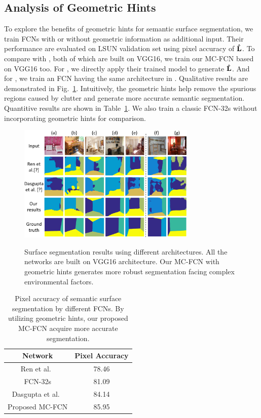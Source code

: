 \subsection{Analysis of Geometric Hints}
\label{sec:ablation}
To explore the benefits of geometric hints for semantic surface segmentation, we train FCNs with or without geometric information as additional input. Their performance are evaluated on LSUN validation set using pixel accuracy of $\mathbf{\hat{L}}$. To compare with \cite{ren2016coarse, dasgupta2016delay}, both of which are built on VGG16, we train our MC-FCN based on VGG16 too. For \cite{ren2016coarse}, we directly apply their trained model to generate $\mathbf{\hat{L}}$. And for \cite{dasgupta2016delay}, we train an FCN having the same architecture in \cite{dasgupta2016delay}. Qualitative results are demonstrated in Fig.~\ref{fig:fcn-comparison}. Intuitively, the geometric hints help remove the spurious regions caused by clutter and generate more accurate semantic segmentation. Quantitive results are shown in Table~\ref{table:ablation}. We also train a classic FCN-32s without incorporating geometric hints for comparison.

\begin{figure}[!ht]
	\centering 
	\textsc{\includegraphics[width=8.5cm]{figure/compare.png}}
	\caption{Surface segmentation results using different architectures. All the networks are built on VGG16 architecture. Our MC-FCN with geometric hints generates more robust segmentation facing complex environmental factors.}
	\label{fig:fcn-comparison}
\end{figure}

\begin{table}
	\centering
	\begin{tabular}{c|c}
		\hline
		Network & Pixel Accuracy\\
		\hline
		Ren et al.~\cite{ren2016coarse} & 78.46 \\
		FCN-32s & 81.09 \\ 
		Dasgupta et al.~\cite{dasgupta2016delay} & 84.14 \\ 
		Proposed MC-FCN  & 85.95 \\
		\hline
	\end{tabular}
	\caption{Pixel accuracy of semantic surface segmentation by different FCNs. By utilizing geometric hints, our proposed MC-FCN acquire more accurate segmentation. }	
	\label{table:ablation}
\end{table}


